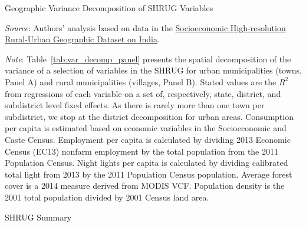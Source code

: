 \documentclass[12pt,letterpaper]{article}
\newcommand{\HOME}{\string~}
\begin{document}
\begin{appendix}

\newpage
\singlespace




\begin{table}[H]
  \caption{Geographic Variance Decomposition of SHRUG Variables} 

  \scriptsize{}
  
    \footnotesize
  \item \textit{Source}: Authors' analysis based on data in the \href{http://www.devdatalab.org/shrug}{Socioeconomic High-resolution
    Rural-Urban Geographic Dataset on India}.
  \item \textit{Note}: Table~\ref{tab:var_decomp_panel} presents the
    spatial decomposition of the variance of a selection of variables
    in the SHRUG for urban municipalities (towns, Panel A) and rural
    municipalities (villages, Panel B). Stated values are the $R^2$
    from regressions of each variable on a set of, respectively,
    state, district, and subdistrict level fixed effects. As there is
    rarely more than one town per subdistrict, we stop at the district
    decomposition for urban areas. Consumption per capita is estimated
    based on economic variables in the Socioeconomic and Caste
    Census. Employment per capita is calculated by dividing 2013
    Economic Census (EC13) nonfarm employment by the total population
    from the 2011 Population Census. Night lights per capita is
    calculated by dividing calibrated total light from 2013 by the
    2011 Population Census population. Average forest cover is a 2014
    measure derived from MODIS VCF. Population density is the 2001
    total population divided by 2001 Census land area.
    
  \label{tab:var_decomp_panel}
\end{table}


\newpage
\begin{landscape}
\begin{table}[H]\caption{SHRUG Summary}
  \footnotesize
  
  \label{tab:contents}
\end{table}
\end{landscape}
\newpage


\end{appendix}
\end{document}
